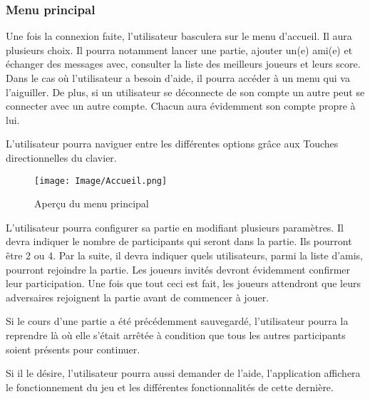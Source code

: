 \documentclass[french, utf8]{article}
\begin{document}
\subsubsection{Menu principal}

\label{sec:Menu principal}

Une fois la connexion faite, l'utilisateur basculera sur le menu d'accueil. Il aura plusieurs choix. Il pourra notamment lancer une partie, ajouter un(e) ami(e) et échanger des messages avec, consulter la liste des meilleurs joueurs et leurs score. Dans le cas où l'utilisateur a besoin d'aide, il pourra accéder à un menu qui va l'aiguiller.
De plus, si un utilisateur se déconnecte de son compte un autre peut se connecter avec un autre compte. Chacun aura évidemment son compte propre à lui.

L'utilisateur pourra naviguer entre les différentes options grâce aux Touches directionnelles du clavier.  \newline

\begin{figure}[ht]

     \centering
    \texttt{[image: Image/Accueil.png]}
\caption{Aperçu du menu principal}
\end{figure}
L'utilisateur pourra configurer sa partie en modifiant plusieurs paramètres. Il devra indiquer le nombre de participants qui seront dans la partie. Ils pourront être 2 ou 4. Par la suite, il devra indiquer quels utilisateurs, parmi la liste d'amis, pourront rejoindre la partie. Les joueurs invités devront évidemment confirmer leur participation. Une fois que tout ceci est fait, les joueurs attendront que leurs adversaires rejoignent la partie avant de commencer à jouer. \newline

Si le cours d'une partie a été précédemment sauvegardé, l'utilisateur pourra la reprendre là où elle s'était arrêtée à condition que tous les autres participants soient présents pour continuer.

Si il le désire, l'utilisateur pourra aussi demander de l'aide, l'application affichera le fonctionnement du jeu et les différentes fonctionnalités de cette dernière.



\end{document}

